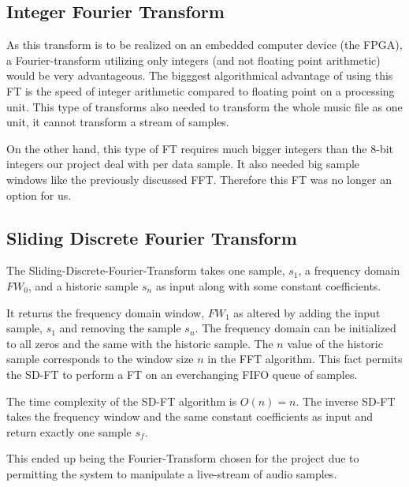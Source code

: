 \subsection{Integer Fourier Transform}
As this transform is to be realized on an embedded computer device (the FPGA), a
Fourier-transform utilizing only integers (and not floating point arithmetic)
would be very advantageous. The bigggest algorithmical advantage of using this
FT is the speed of integer arithmetic compared to floating point on a processing
unit. This type of transforms also needed to transform the whole music file as
one unit, it cannot transform a stream of samples.

On the other hand, this type of FT requires much bigger integers than the
8-bit integers our project deal with per data sample. It also needed big sample
windows like the previously discussed FFT. Therefore this FT was no longer an
option for us.

\subsection{Sliding Discrete Fourier Transform}\label{appendix:sd-ft}
The Sliding-Discrete-Fourier-Transform takes one sample, $s_1$, a frequency
domain $FW_0$, and a historic sample $s_n$ as input along with some constant
coefficients.

It returns the frequency domain window, $FW_1$ as altered by adding the input
sample, $s_1$ and removing the sample $s_n$. The frequency domain can be
initialized to all zeros and the same with the historic sample. The $n$ value of
the historic sample corresponds to the window size $n$ in the FFT algorithm.
This fact permits the SD-FT to perform a FT on an everchanging FIFO queue of
samples.

The time complexity of the SD-FT algorithm is $O(n) = n$. The inverse SD-FT
takes the frequency window and the same constant coefficients as input and
return exactly one sample $s_f$.

This ended up being the Fourier-Transform chosen for the project due to
permitting the system to manipulate a live-stream of audio samples.

